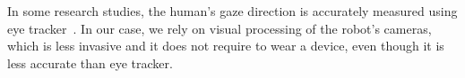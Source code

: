 \documentclass[runningheads,a4paper]{llncs}
\begin{document}
In some research studies, the human's gaze direction is accurately measured using 
eye tracker~\cite{ishii2011combining,mitsugami2005robot}.
In our case, we rely on visual processing of the robot's cameras, which is less invasive and it does not require to wear a device, even though it is less accurate than eye tracker.
\end{document}
